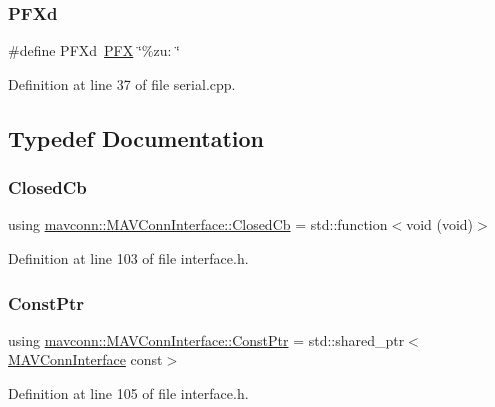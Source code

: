 \subsubsection{\texorpdfstring{PFXd}{PFXd}\hspace{0.1cm}{\footnotesize\ttfamily [3/3]}}
{\footnotesize\ttfamily \#define P\+F\+Xd~\mbox{\hyperlink{group__mavconn_ga176e4c39a833f4d01f0ecd322c0f4343}{P\+FX}} \char`\"{}\%zu\+: \char`\"{}}



Definition at line 37 of file serial.\+cpp.



\subsection{Typedef Documentation}
\mbox{\label{group__mavconn_ga6eef19e745c84f9b0b85d704b2e3e430}} 
\subsubsection{\texorpdfstring{ClosedCb}{ClosedCb}}
{\footnotesize\ttfamily using \mbox{\hyperlink{group__mavconn_ga6eef19e745c84f9b0b85d704b2e3e430}{mavconn\+::\+M\+A\+V\+Conn\+Interface\+::\+Closed\+Cb}} =  std\+::function$<$void (void)$>$}



Definition at line 103 of file interface.\+h.

\mbox{\label{group__mavconn_ga47036145ce30f67fcd830e28712216eb}} 
\subsubsection{\texorpdfstring{ConstPtr}{ConstPtr}}
{\footnotesize\ttfamily using \mbox{\hyperlink{group__mavconn_ga47036145ce30f67fcd830e28712216eb}{mavconn\+::\+M\+A\+V\+Conn\+Interface\+::\+Const\+Ptr}} =  std\+::shared\+\_\+ptr$<$\mbox{\hyperlink{classmavconn_1_1MAVConnInterface}{M\+A\+V\+Conn\+Interface}} const$>$}



Definition at line 105 of file interface.\+h.

\mbox{\label{group__mavconn_ga46feb20496b24d733abd4e68ef29bc90}} 
